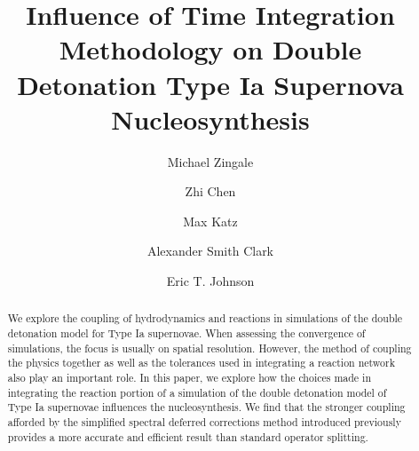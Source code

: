 \documentclass[modern]{aastex631}
\begin{document}
\title{Influence of Time Integration Methodology on Double Detonation Type
Ia Supernova Nucleosynthesis}


\author[0000-0001-8401-030X]{Michael Zingale}

\author[0000-0002-2839-107X]{Zhi Chen}


\author[0000-0003-0439-4556]{Max Katz}


\author[0000-0001-5961-1680]{Alexander Smith Clark}

\author[0000-0003-3603-6868]{Eric T. Johnson}



\begin{abstract}
We explore the coupling of hydrodynamics and reactions in simulations of
the double detonation model for Type Ia supernovae.  When assessing the
convergence of simulations, the focus is usually on spatial resolution.
However, the method of coupling the physics together as well as the
tolerances used in integrating a reaction network also play an important role.
In this paper, we explore how the choices made in integrating the reaction
portion of a simulation of the double detonation model of Type Ia supernovae
influences the nucleosynthesis.  We find that the stronger coupling
afforded by the simplified spectral deferred corrections method introduced
previously provides a more accurate and efficient result than standard
operator splitting.
\end{abstract}

\end{document}
